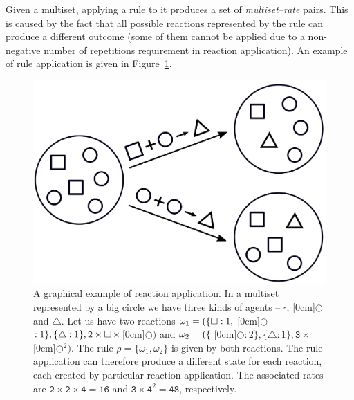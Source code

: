 \documentclass[11pt,a4paper]{report}
\begin{document}
Given a multiset, applying a rule to it produces a set of \emph{multiset--rate} pairs. This is caused by the fact that all possible reactions represented by the rule can produce a different outcome (some of them cannot be applied due to a non-negative number of repetitions requirement in reaction application). An example of rule application is given in Figure~\ref{rule_example}.

\begin{figure}[!h]
	\begin{center}
		\includegraphics[scale=0.2]{images/rule.png}
	\end{center}
	\caption{A graphical example of reaction application. In a multiset represented by a big circle we have three kinds of agents -- {\large $\square$}, \raisebox{0.04cm}[0cm]{{$\bigcirc$}} and $\bigtriangleup$. Let us have two reactions $\omega_1 = (\{{\large \square}:1,\hspace{0.1cm} $\raisebox{0.04cm}[0cm]{{$\bigcirc$}}\hspace{0.1cm}$:1\}, \{\bigtriangleup:1\}, \mathtt{2}\times{\large \square}\hspace{0.05cm}\times$\hspace{0.05cm}\raisebox{0.04cm}[0cm]{{$\bigcirc$}}$)$ and $\omega_2 = (\{\hspace{0.1cm} $\raisebox{0.04cm}[0cm]{{$\bigcirc$}}\hspace{0.1cm}$:2\}, \{\bigtriangleup:1\}, \mathtt{3}\times$\hspace{0.05cm}\raisebox{0.04cm}[0cm]{{$\bigcirc$}}$^2)$. The rule $\rho = \{ \omega_1, \omega_2 \}$ is given by both reactions. The rule application can therefore produce a different state for each reaction, each created by particular reaction application. The associated rates are $\mathtt{2} \times \mathtt{2} \times \mathtt{4} = \mathtt{16}$ and $\mathtt{3} \times \mathtt{4}^2 = \mathtt{48}$, respectively.}\label{rule_example}
\end{figure}
\end{document}
